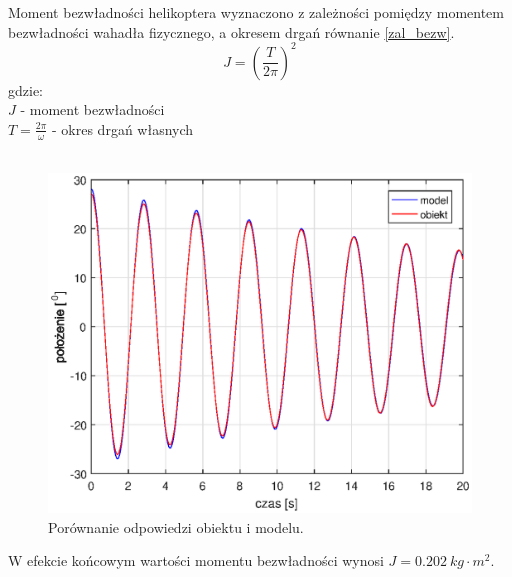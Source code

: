 Moment bezwładności helikoptera wyznaczono z zależności pomiędzy momentem bezwładności wahadła fizycznego, a okresem drgań równanie \ref{zal_bezw}.\\
 \begin{equation}\label{zal_bezw}
 J = (\frac{T}{2\pi})^2
 \end{equation}
 gdzie: \\
 $J$ - moment bezwładności\\
 $T = \frac{2\pi}{\omega}$ - okres drgań własnych\\\\
\begin{figure}[h!]
	\centering
	\includegraphics[scale = 1]{fig/bezwladnosc.eps}
	\caption		
	{Porównanie odpowiedzi obiektu i modelu.}
	\label{rys_bezwl}
\end{figure}
W efekcie końcowym wartości momentu bezwładności wynosi $J = 0.202 \ kg \cdot m^2.$